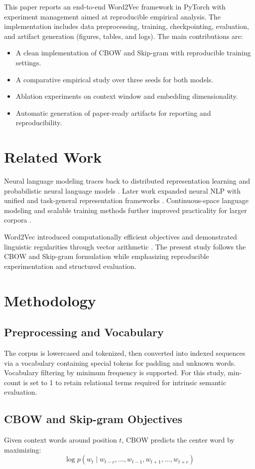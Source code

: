 \documentclass[conference]{IEEEtran}
\begin{document}
This paper reports an end-to-end Word2Vec framework in PyTorch with experiment management aimed at reproducible empirical analysis. The implementation includes data preprocessing, training, checkpointing, evaluation, and artifact generation (figures, tables, and logs). The main contributions are:
\begin{itemize}
\item A clean implementation of CBOW and Skip-gram with reproducible training settings.
\item A comparative empirical study over three seeds for both models.
\item Ablation experiments on context window and embedding dimensionality.
\item Automatic generation of paper-ready artifacts for reporting and reproducibility.
\end{itemize}

\section{Related Work}
Neural language modeling traces back to distributed representation learning and probabilistic neural language models \cite{b1,b10,b26}. Later work expanded neural NLP with unified and task-general representation frameworks \cite{b4,b5}. Continuous-space language modeling and scalable training methods further improved practicality for larger corpora \cite{b27,b25,b24}. 

Word2Vec introduced computationally efficient objectives and demonstrated linguistic regularities through vector arithmetic \cite{b20,b21}. The present study follows the CBOW and Skip-gram formulation while emphasizing reproducible experimentation and structured evaluation.

\section{Methodology}
\subsection{Preprocessing and Vocabulary}
The corpus is lowercased and tokenized, then converted into indexed sequences via a vocabulary containing special tokens for padding and unknown words. Vocabulary filtering by minimum frequency is supported. For this study, min-count is set to 1 to retain relational terms required for intrinsic semantic evaluation.

\subsection{CBOW and Skip-gram Objectives}
Given context words around position $t$, CBOW predicts the center word by maximizing:
\begin{equation}
\log p(w_t \mid w_{t-c},\ldots,w_{t-1},w_{t+1},\ldots,w_{t+c})
\end{equation}
\end{document}
